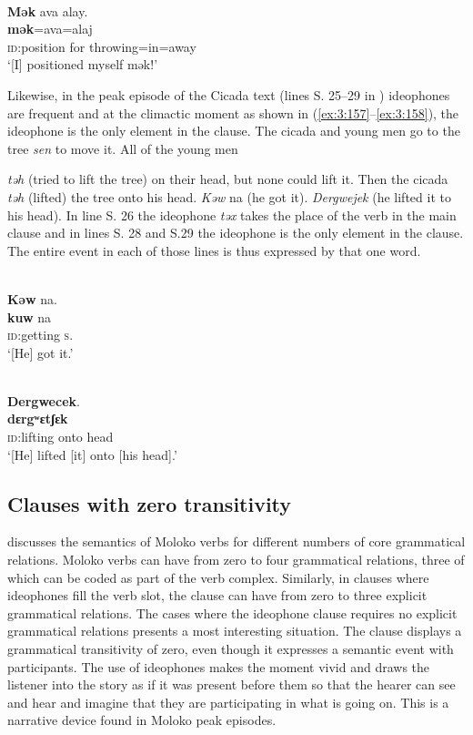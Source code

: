 \ea \label{ex:3:156}\\
\textbf{Mək}  ava  alay.\\
\gll  \textbf{mək}=ava=alaj\\
      {\textsc{id}:position for throwing}=in=away\\
\glt  ‘[I] positioned myself mək!’
\z

\largerpage
Likewise, in the peak episode of the Cicada text (lines S. 25--29 in ) ideophones are frequent and at the climactic moment as shown in (\ref{ex:3:157}--\ref{ex:3:158}), the ideophone is the only element in the clause. The cicada and young men go to the tree \textit{sen} to move it. All of the young men {\textit{təh} (tried to lift the tree) on their head, but none could lift it. Then the cicada \textit{təh} (lifted) the tree onto his head. \textit{Kəw} na (he got it). \textit{ Dergwejek} (he lifted it to his head). In line S. 26 the ideophone \textit{təx} takes the place of the verb in the main clause and in lines S. 28 and S.29 the ideophone is the only element in the clause. The entire event in each of those lines is thus expressed by that one word. 


\ea \label{ex:3:157}\\
\textbf{Kəw}  na.\\
\gll  \textbf{kuw}  na\\
      \textsc{id}:getting  \textsc{s}.{\DO}\\
\glt  ‘[He] got it.’ 
\z


\ea \label{ex:3:158}\\
\textbf{Dergwecek}.~\\
\gll  \textbf{dɛrgʷɛtʃɛk}\\
      \textsc{id}:{lifting onto head}\\
\glt  ‘[He] lifted [it] onto [his head].’
\z

\subsection{Clauses with zero transitivity}\label{sec:3.6.3}
\hypertarget{RefHeading1211301525720847}{}
\largerpage
{} discusses the semantics of Moloko verbs for different numbers of core grammatical relations. Moloko verbs can have from zero to four grammatical relations, three of which can be coded as part of the verb complex.  Similarly, in clauses where ideophones fill the verb slot, the clause can have from zero to three explicit grammatical relations. The cases where the ideophone clause requires no explicit grammatical relations presents a most interesting situation. The clause displays a grammatical transitivity of zero, even though it expresses a semantic event with participants. The use of ideophones makes the moment vivid and draws the listener into the story as if it was present before them so that the hearer can see and hear and imagine that they are participating in what is going on. This is a narrative device found in Moloko peak episodes.

}
